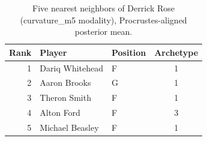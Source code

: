 \begin{table}[htbp]
  \centering\small
  \begin{tabular}{rllc}
    \toprule
    Rank & Player & Position & Archetype \\
    \midrule
    1 & Dariq Whitehead & F & 1 \\
    2 & Aaron Brooks & G & 1 \\
    3 & Theron Smith & F & 1 \\
    4 & Alton Ford & F & 3 \\
    5 & Michael Beasley & F & 1 \\
    \bottomrule
  \end{tabular}
  \caption{Five nearest neighbors of Derrick Rose (curvature_m5 modality), Procrustes-aligned posterior mean.}
  \label{tab:Derrick_Rose_neighbors_curvature_m5}
\end{table}

